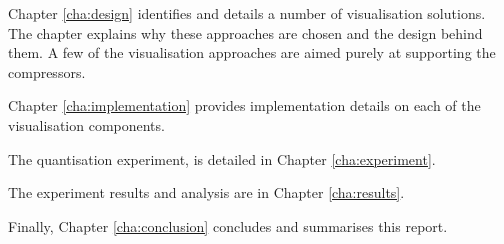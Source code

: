 Chapter \ref{cha:design} identifies and details a number of visualisation
solutions. The chapter explains why these approaches are chosen and the design
behind them. A few of the visualisation approaches are aimed purely at
supporting the compressors.

Chapter \ref{cha:implementation} provides implementation details on each of the
visualisation components.

The quantisation experiment, is detailed in Chapter \ref{cha:experiment}.

The experiment results and analysis are in Chapter \ref{cha:results}.

Finally, Chapter \ref{cha:conclusion} concludes and summarises this report.



